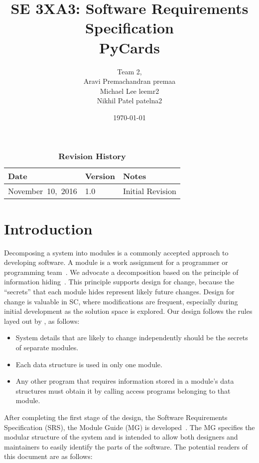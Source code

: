 \documentclass[12pt, titlepage]{article}
\title{SE 3XA3: Software Requirements Specification\\PyCards}
\author{Team 2,
		\\ Aravi Premachandran premaa
		\\ Michael Lee leemr2
		\\ Nikhil Patel patelna2
}
\date{\today}
\begin{document}
	\maketitle
	\tableofcontents
	\listoftables
	\listoffigures
	\begin{table}[bp]
		\caption{\bf Revision History}
		\begin{tabularx}{\textwidth}{p{4cm}p{2cm}X}
			\toprule {\bf Date} & {\bf Version} & {\bf Notes}\\
			\midrule
			\mbox{November 10, 2016} & 1.0 & Initial Revision\\
			\bottomrule
		\end{tabularx}
	\end{table}
	\newpage
	\indent
	\newpage
	\section{Introduction}
	Decomposing a system into modules is a commonly accepted approach to 
	developing software.  A module is a work assignment for a programmer or 
	programming team~\citep{ParnasEtAl1984}.  We advocate a decomposition
	based on the principle of information hiding~\citep{Parnas1972a}.  This
	principle supports design for change, because the ``secrets'' that each 
	module hides represent likely future changes.  Design for change is 
	valuable in SC, where modifications are frequent, especially during initial 
	development as the solution space is explored. Our design follows the rules 
	layed out by \citet{ParnasEtAl1984}, as follows:
	\begin{itemize}
	\item System details that are likely to change independently should be the 
	secrets of separate modules.
	\item Each data structure is used in only one module.
	\item Any other program that requires information stored in a module's data 
	structures must obtain it by calling access programs belonging to that 
	module.
	\end{itemize}
	After completing the first stage of the design, the Software Requirements
	Specification (SRS), the Module Guide (MG) is 
	developed~\citep{ParnasEtAl1984}. 
	The MG specifies the modular structure of the system and is intended to 
	allow both designers and maintainers to easily identify the parts of the 
	software.  The potential readers of this document are as follows:
\end{document}
